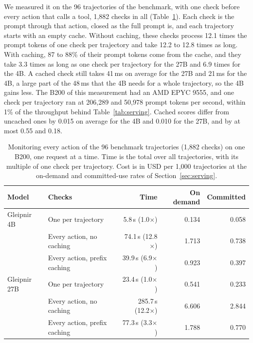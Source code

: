 We measured it on the 96 trajectories of the benchmark, with one check before every action that calls a tool, 1,882 checks in all (Table~\ref{tab:prefix-replay}).
Each check is the prompt through that action, closed as the full prompt is, and each trajectory starts with an empty cache.
Without caching, these checks process 12.1 times the prompt tokens of one check per trajectory and take 12.2 to 12.8 times as long.
With caching, 87 to 88\% of their prompt tokens come from the cache, and they take 3.3 times as long as one check per trajectory for the 27B and 6.9 times for the 4B.
A cached check still takes 41\,ms on average for the 27B and 21\,ms for the 4B, a large part of the 48\,ms that the 4B needs for a whole trajectory, so the 4B gains less.
The B200 of this measurement had an AMD EPYC 9555, and one check per trajectory ran at 206,289 and 50,978 prompt tokens per second, within 1\% of the throughput behind Table~\ref{tab:serving}.
Cached scores differ from uncached ones by 0.015 on average for the 4B and 0.010 for the 27B, and by at most 0.55 and 0.18.

\begin{table}[h]
\caption{Monitoring every action of the 96 benchmark trajectories (1,882 checks) on one B200, one request at a time. Time is the total over all trajectories, with its multiple of one check per trajectory. Cost is in USD per 1,000 trajectories at the on-demand and committed-use rates of Section~\ref{sec:serving}.}
\label{tab:prefix-replay}
\centering
\small
\begin{tabular}{@{}llrrr@{}}
\toprule
Model & Checks & Time & On demand & Committed \\
\midrule
Gleipnir 4B & One per trajectory & 5.8\,s (1.0$\times$) & 0.134 & 0.058 \\
 & Every action, no caching & 74.1\,s (12.8$\times$) & 1.713 & 0.738 \\
 & Every action, prefix caching & 39.9\,s (6.9$\times$) & 0.923 & 0.397 \\
\midrule
Gleipnir 27B & One per trajectory & 23.4\,s (1.0$\times$) & 0.541 & 0.233 \\
 & Every action, no caching & 285.7\,s (12.2$\times$) & 6.606 & 2.844 \\
 & Every action, prefix caching & 77.3\,s (3.3$\times$) & 1.788 & 0.770 \\
\bottomrule
\end{tabular}
\end{table}

